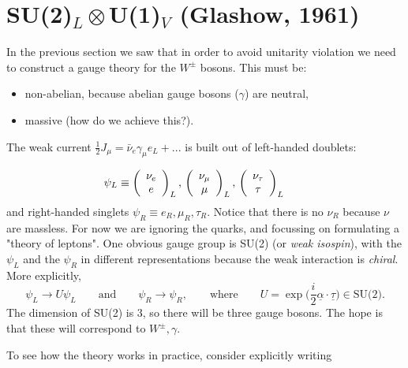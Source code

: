 
\section{SU(2)$_L \otimes$U(1)$_V$ (Glashow, 1961)}
%
In the previous section we saw that in order to avoid unitarity violation we need to construct a gauge theory for the $W^\pm$ bosons. This must be:
\begin{itemize}
\item non-abelian, because abelian gauge bosons ($\gamma$) are neutral,
\item massive (how do we achieve this?).
\end{itemize}
The weak current $\frac{1}{2} J_\mu = \bar{\nu}_e\gamma_\mu e_L + ...$ is built out of left-handed doublets:

\[ \psi_L \equiv \left( \begin{array}{cc}
\nu_e   \\
e   \end{array} \right)_L, \qquad
  \\ \left( \begin{array}{cc}
 \nu_\mu \\
\mu   \end{array} \right)_L, \qquad  \\ 
\left( \begin{array}{cc}
 \nu_\tau \\
\tau   \end{array} \right)_L \qquad\] 
and right-handed singlets 
$\psi_R \equiv e_R, \mu_R, \tau_R$. Notice that there is no $\nu_R$ because $\nu$ are massless. For now we are ignoring the quarks, and focussing on formulating a "theory of leptons". One obvious gauge group is SU(2) (or \textit{weak isospin}), with the $\psi_L$ and the $\psi_R$ in different representations because the weak interaction is \textit{chiral}. More explicitly,
\begin{equation}
\psi_L \to U \psi_L \qquad \text{and} \qquad \psi_R \to \psi_R, \qquad \text{where} \qquad U=\exp\bigg(\frac{i}{2}\underline{\alpha}\cdot\underline{\tau}\bigg) \in \text{SU(2)}.
\end{equation}
The dimension of SU(2) is 3, so there will be three gauge bosons. The hope is that these will correspond to $W^\pm, \gamma$. 

To see how the theory works in practice, consider explicitly writing

